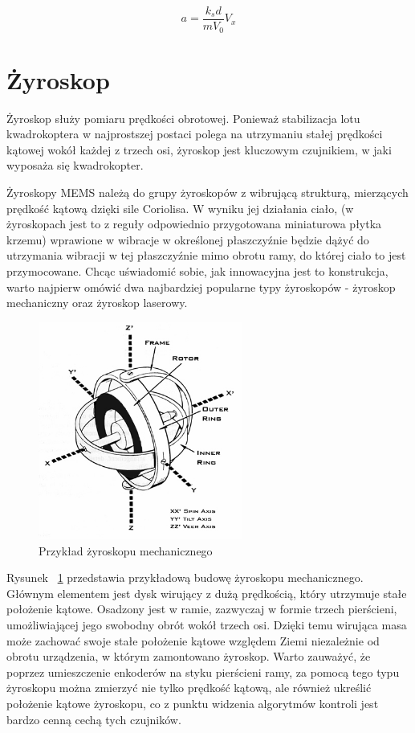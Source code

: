 \begin{equation}
	a = \frac{k{_s}d}{mV_0}V_x
\end{equation}

\section{Żyroskop}

Żyroskop służy pomiaru prędkości obrotowej. Ponieważ stabilizacja lotu kwadrokoptera w najprostszej postaci polega na utrzymaniu stałej prędkości kątowej wokół każdej z trzech osi, żyroskop jest kluczowym czujnikiem, w jaki wyposaża się kwadrokopter. 

Żyroskopy MEMS należą do grupy żyroskopów z wibrującą strukturą, mierzących prędkość kątową dzięki sile Coriolisa. W wyniku jej działania ciało, (w żyroskopach jest to z reguły odpowiednio przygotowana miniaturowa płytka krzemu) wprawione w wibracje w określonej płaszczyźnie będzie dążyć do utrzymania wibracji w tej płaszczyźnie mimo obrotu ramy, do której ciało to jest przymocowane. Chcąc uświadomić sobie, jak innowacyjna jest to konstrukcja, warto najpierw omówić dwa najbardziej popularne typy żyroskopów - żyroskop mechaniczny oraz żyroskop laserowy.

\begin{figure}[H]
	\centering
	\includegraphics[width=0.6\textwidth]{Pictures/Gyroscope_Theory.jpg}
	\caption[Przykład żyroskopu mechanicznego]{Przykład żyroskopu mechanicznego}
	\label{fig:Gyroscope_Theory}
\end{figure}

Rysunek ~\ref{fig:Gyroscope_Theory} przedstawia przykładową budowę żyroskopu mechanicznego. Głównym elementem jest dysk wirujący z dużą prędkością, który utrzymuje stałe położenie kątowe. Osadzony jest w ramie, zazwyczaj w formie trzech pierścieni, umożliwiającej jego swobodny obrót wokół trzech osi. Dzięki temu wirująca masa może zachować swoje stałe położenie kątowe względem Ziemi niezależnie od obrotu urządzenia, w którym zamontowano żyroskop. Warto zauważyć, że poprzez umieszczenie enkoderów na styku pierścieni ramy, za pomocą tego typu żyroskopu można zmierzyć nie tylko prędkość kątową, ale również ukreślić położenie kątowe żyroskopu, co z punktu widzenia algorytmów kontroli jest bardzo cenną cechą tych czujników. 

